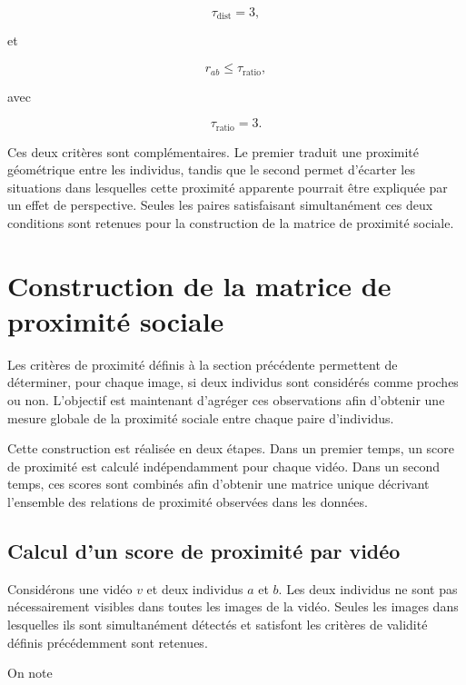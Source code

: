 \documentclass[11pt,a4paper]{report}
\begin{document}
\[
\tau_{\mathrm{dist}}=3,
\]

et

\begin{equation}
r_{ab}
\leq
\tau_{\mathrm{ratio}},
\end{equation}

avec

\[
\tau_{\mathrm{ratio}}=3.
\]

Ces deux critères sont complémentaires. Le premier traduit une proximité
géométrique entre les individus, tandis que le second permet d'écarter les
situations dans lesquelles cette proximité apparente pourrait être expliquée par
un effet de perspective. Seules les paires satisfaisant simultanément ces deux
conditions sont retenues pour la construction de la matrice de proximité
sociale. 

\section{Construction de la matrice de proximité sociale}
\label{sec:construction_matrice}

Les critères de proximité définis à la section précédente permettent de
déterminer, pour chaque image, si deux individus sont considérés comme proches
ou non. L'objectif est maintenant d'agréger ces observations afin d'obtenir une
mesure globale de la proximité sociale entre chaque paire d'individus.

Cette construction est réalisée en deux étapes. Dans un premier temps, un score
de proximité est calculé indépendamment pour chaque vidéo. Dans un second temps,
ces scores sont combinés afin d'obtenir une matrice unique décrivant l'ensemble
des relations de proximité observées dans les données.

\subsection*{Calcul d'un score de proximité par vidéo}

Considérons une vidéo $v$ et deux individus $a$ et $b$. Les deux individus ne
sont pas nécessairement visibles dans toutes les images de la vidéo. Seules les
images dans lesquelles ils sont simultanément détectés et satisfont les critères
de validité définis précédemment sont retenues.

On note
\end{document}
